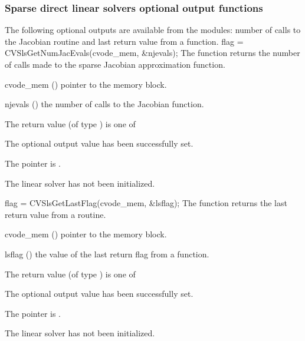 \subsubsection{Sparse direct linear solvers optional output functions}
\label{sss:optout_sls}
The following optional outputs are available from the {\cvsls} modules:
number of calls to the Jacobian routine
and last return value from a {\cvsls} function.
{
  flag = CVSlsGetNumJacEvals(cvode\_mem, \&njevals);
}
{
  The function  returns the
  number of calls made to the {\cvsls} sparse
  Jacobian approximation function.
}
{
  \begin{args}
  \item[cvode\_mem] ()
    pointer to the {\cvodes} memory block.
  \item[njevals] ()
    the number of calls to the Jacobian function.
  \end{args}
}
{
  The return value  (of type ) is one of
  \begin{args}
  \item[\Id{CVSLS\_SUCCESS}] 
    The optional output value has been successfully set.
  \item[\Id{CVSLS\_MEM\_NULL}]
    The  pointer is .
  \item[\Id{CVSLS\_LMEM\_NULL}]
    The {\cvsls} linear solver has not been initialized.
  \end{args}
}
{}
{
  flag = CVSlsGetLastFlag(cvode\_mem, \&lsflag);
}
{
  The function  returns the
  last return value from a {\cvsls} routine. 
}
{
  \begin{args}
  \item[cvode\_mem] ()
    pointer to the {\cvodes} memory block.
  \item[lsflag] ()
    the value of the last return flag from a {\cvsls} function.
  \end{args}
}
{
  The return value  (of type ) is one of
  \begin{args}
  \item[\Id{CVSLS\_SUCCESS}] 
    The optional output value has been successfully set.
  \item[\Id{CVSLS\_MEM\_NULL}]
    The  pointer is .
  \item[\Id{CVSLS\_LMEM\_NULL}]
    The {\cvsls} linear solver has not been initialized.
  \end{args}
}
